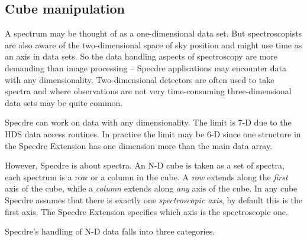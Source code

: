 
\subsection{\label{specdrecubeman}Cube manipulation}

   A spectrum may be thought of as a one-dimensional data set.  But
   spectroscopists are also aware of the two-dimensional space of sky
   position and might use time as an axis in data sets.  So the data
   handling aspects of spectroscopy are more demanding than image
   processing -- Specdre applications may encounter data with any
   dimensionality.  Two-dimensional detectors are often used to take
   spectra and where observations are not very time-consuming
   three-dimensional data sets may be quite common.

   Specdre can work on data with any dimensionality.  The limit is 7-D
   due to the HDS data access routines.  In practice the limit may be
   6-D since one structure in the Specdre Extension has one dimension
   more than the main data array.

   However, Specdre is about spectra.  An N-D cube is taken as a set of
   spectra, each spectrum is a row or a column in the cube.  A {\it row}
   extends along the {\it first} axis of the cube, while a {\it column}
   extends along {\it any} axis of the cube.  In any cube Specdre
   assumes that there is exactly one {\it spectroscopic axis}, by
   default this is the first axis.  The Specdre Extension specifies
   which axis is the spectroscopic one.

   Specdre's handling of N-D data falls into three categories.

